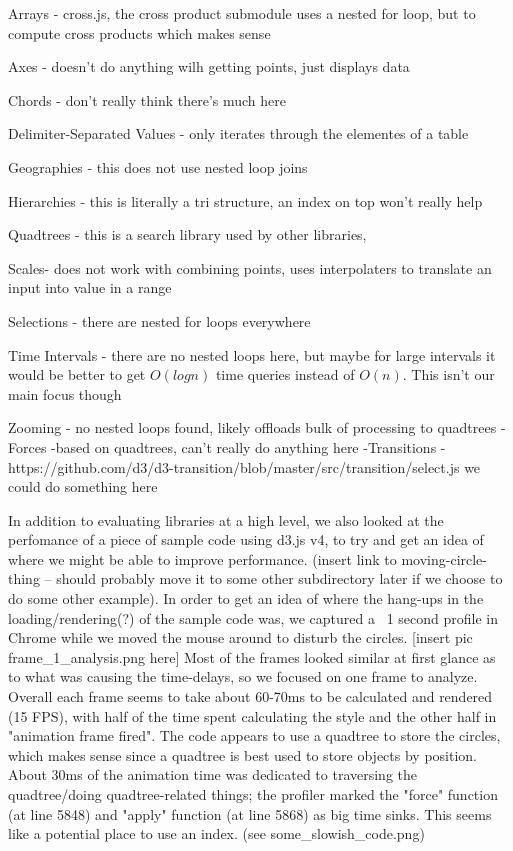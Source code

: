 \documentclass[a4paper]{article}
\begin{document}
Arrays - cross.js, the cross product submodule uses a nested for loop, but to compute cross products which makes sense

Axes - doesn't do anything wilh getting points, just displays data

Chords - don't really think there's much here

Delimiter-Separated Values - only iterates through the elementes of a table

Geographies - this does not use nested loop joins

Hierarchies - this is literally a tri structure, an index on top won't really help

Quadtrees - this is a search library used by other libraries, 

Scales- does not work with combining points, uses interpolaters to translate an input into value in a range

Selections - there are nested for loops everywhere

Time Intervals - there are no nested loops here, but maybe for large intervals it would be better to get $O(logn)$ time queries instead of $O(n)$. This isn't our main focus though

Zooming - no nested loops found, likely offloads bulk of processing to quadtrees
-Forces -based on quadtrees, can't really do anything here
-Transitions - https://github.com/d3/d3-transition/blob/master/src/transition/select.js we could do something here

In addition to evaluating libraries at a high level, we also looked at the perfomance of a piece of sample code using d3.js v4, to try and get an idea of where we might be able to improve performance. (insert link to moving-circle-thing -- should probably move it to some other subdirectory later if we choose to do some other example). In order to get an idea of where the hang-ups in the loading/rendering(?) of the sample code was, we captured a ~1 second profile in Chrome while we moved the mouse around to disturb the circles. [insert pic frame_1_analysis.png here] Most of the frames looked similar at first glance as to what was causing the time-delays, so we focused on one frame to analyze. Overall each frame seems to take about 60-70ms to be calculated and rendered (15 FPS), with half of the time spent calculating the style and the other half in "animation frame fired". The code appears to use a quadtree to store the circles, which makes sense since a quadtree is best used to store objects by position. About 30ms of the animation time was dedicated to traversing the quadtree/doing quadtree-related things; the profiler marked the "force" function (at line 5848) and "apply" function (at line 5868) as big time sinks. This seems like a potential place to use an index. (see some_slowish_code.png)
\end{document}
